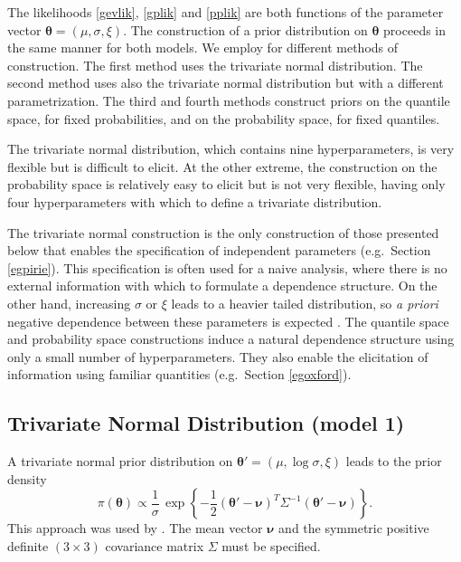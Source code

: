 \documentclass[11pt,a4paper]{article}
\newcommand{\bs}{\boldsymbol}
\begin{document}
The likelihoods \eqref{gevlik}, \eqref{gplik} and \eqref{pplik} are
both functions of the parameter vector $\bs{\theta} =
(\mu,\sigma,\xi)$.  The construction of a prior distribution on
$\bs{\theta}$ proceeds in the same manner for both models.  We employ
for different methods of construction.  The first method uses the
trivariate normal distribution.  The second method uses also the
trivariate normal distribution but with a different parametrization.
The third and fourth methods construct priors on the quantile space,
for fixed probabilities, and on the probability space, for fixed
quantiles.

The trivariate normal distribution, which contains nine
hyperparameters, is very flexible but is difficult to elicit.  At the
other extreme, the construction on the probability space is relatively
easy to elicit but is not very flexible, having only four
hyperparameters with which to define a trivariate distribution.

The trivariate normal construction is the only construction of those
presented below that enables the specification of independent
parameters (e.g.\ Section \ref{egpirie}).  This specification is often
used for a naive analysis, where there is no external information with
which to formulate a dependence structure.  On the other hand,
increasing $\sigma$ or $\xi$ leads to a heavier tailed distribution,
so \emph{a priori} negative dependence between these parameters is
expected \citep{coletawn96}.  The quantile space and probability space
constructions induce a natural dependence structure using only a small
number of hyperparameters.  They also enable the elicitation of
information using familiar quantities (e.g.\ Section \ref{egoxford}).
  
\subsection{Trivariate Normal Distribution (model 1)}

A trivariate normal prior distribution on $\bs{\theta}' = (\mu, \log
\sigma, \xi)$ leads to the prior density
\begin{equation}
  \pi(\bs{\theta}) \propto \frac{1}{\sigma} \, \exp\left\{-\frac{1}{2}
    (\bs{\theta}' - \bs{\nu})^T \Sigma^{-1} (\bs{\theta}' - \bs{\nu})
  \right\}. 
\label{priornorm1}
\end{equation}  
This approach was used by \citet{colepowe96}.  The mean vector
$\bs{\nu}$ and the symmetric positive definite $(3 \times 3)$
covariance matrix $\Sigma$ must be specified.
\end{document}
